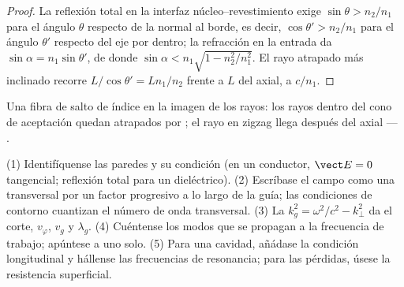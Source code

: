\begin{proof}
La reflexión total en la interfaz núcleo--revestimiento exige $\sin\theta >
n_2/n_1$ para el ángulo $\theta$ respecto de la normal al borde, es decir, $\cos
\theta' > n_2/n_1$ para el ángulo $\theta'$ respecto del eje por dentro; la refracción
en la entrada da $\sin\alpha = n_1\sin\theta'$, de donde $\sin\alpha < n_1\sqrt{1
- n_2^2/n_1^2}$. El rayo atrapado más inclinado recorre $L/\cos\theta' = Ln_1/n_2$
frente a $L$ del axial, a $c/n_1$.
\end{proof}

\begin{omfigure}

{\small Una fibra de salto de índice en la imagen de los rayos: los rayos dentro del
cono de aceptación quedan atrapados por ; el rayo en
zigzag llega después del axial --- .}
\end{omfigure}

\begin{method}\label{met:b2:guided-waves:method}
(1) Identifíquense las paredes y su condición (en un conductor, $\vect E = 0$
tangencial; reflexión total para un dieléctrico). (2) Escríbase el campo
como una  transversal por un factor progresivo a lo largo de la
guía; las condiciones de contorno cuantizan el número de onda transversal.
(3) La  $k_g^2 = \omega^2/c^2 - k_\perp^2$ da el
corte, $v_\varphi$, $v_g$ y $\lambda_g$. (4) Cuéntense los modos que se propagan a la
frecuencia de trabajo; apúntese a uno solo. (5) Para una cavidad, añádase la condición
longitudinal y hállense las frecuencias de resonancia; para las pérdidas, úsese la
resistencia superficial.
\end{method}


